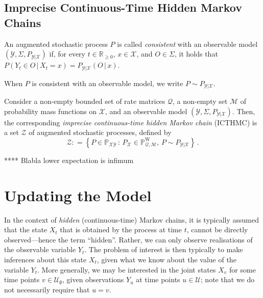 \documentclass[twoside,11pt]{article}
\newcommand{\reals}{\mathbb{R}}
\newcommand{\realsnonneg}{\reals_{\geq 0}}
\newcommand{\states}{\mathcal{X}}
\newcommand{\observs}{\mathcal{Y}}
\newcommand{\processes}{\mathbb{P}}
\newcommand{\wprocesses}{\processes^{\mathrm{W}}}
\newcommand{\rateset}{\mathcal{Q}}
\newcommand{\coloneqq}{:\!=}
\begin{document}
\subsection{Imprecise Continuous-Time Hidden Markov Chains}

\begin{definition}
An augmented stochastic process $P$ is called \emph{consistent} with an observable model $(\observs,\Sigma,P_{\observs\vert\states})$ if, for every $t\in\realsnonneg$, $x\in\states$, and $O\in\Sigma$, it holds that $P(Y_t\in O\,\vert\,X_t=x)=P_{\observs\vert\states}(O\,\vert\,x)$.

When $P$ is consistent with an observable model, we write $P\sim P_{\observs\vert\states}$.
\end{definition}

\begin{definition}\label{def:hidden_ictmc}
Consider a non-empty bounded set of rate matrices $\rateset$, a non-empty set $\mathcal{M}$ of probability mass functions on $\states$, and an observable model $(\observs,\Sigma,P_{\observs\vert\states})$. Then, the corresponding \emph{imprecise continuous-time hidden Markov chain} (ICTHMC) is a set $\mathcal{Z}$ of augmented stochastic processes, defined by
\begin{equation*}
\mathcal{Z} \coloneqq \left\{ P\in\mathbb{P}_{\states\observs} \,:\, P_{\states}\in\wprocesses_{\rateset,\mathcal{M}},\, P\sim P_{\observs\vert\states}\right\}\,.
\end{equation*}
\end{definition}

**** Blabla lower expectation is infimum

\section{Updating the Model}\label{sec:updating_model}

In the context of \emph{hidden} (continuous-time) Markov chains, it is typically assumed that the state $X_t$ that is obtained by the process at time $t$, cannot be directly observed---hence the term ``hidden''. Rather, we can only observe realisations of the observable variable $Y_t$. The problem of interest is then typically to make inferences about this state $X_t$, given what we know about the value of the variable $Y_t$. More generally, we may be interested in the joint states $X_v$ for some time points $v\in\mathcal{U}_\emptyset$, given observations $Y_u$ at time points $u\in\mathcal{U}$; note that we do not necessarily require that $u=v$.
\end{document}
